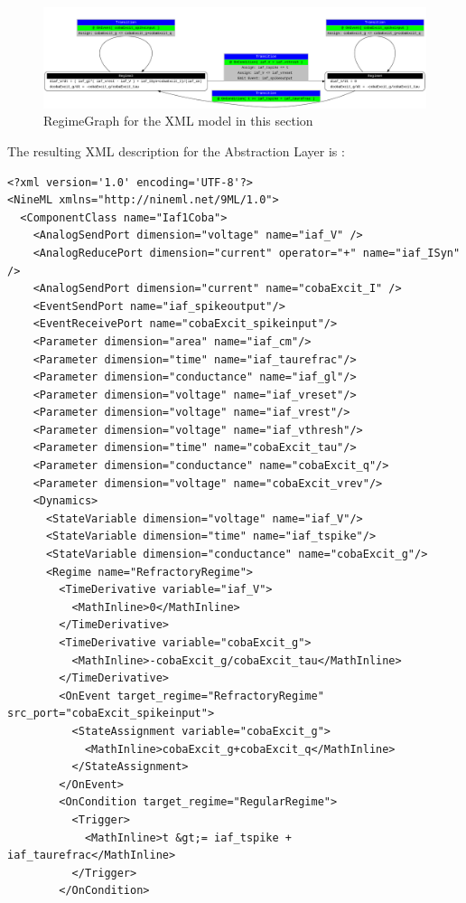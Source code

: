 \documentclass[draftspec]{ninemlspec}
\begin{document}
\begin{figure}[htb!]
\center
\includegraphics[width=14cm]{figures/demo2_Coba1_trnasition.pdf}
\protect\caption{RegimeGraph for the XML model in this section}
\label{fig:EX2_trans}
\end{figure}
\clearpage
The resulting XML description for the Abstraction Layer is :
\begin{lstlisting}[label=code:xmliaf2]
<?xml version='1.0' encoding='UTF-8'?>
<NineML xmlns="http://nineml.net/9ML/1.0">
  <ComponentClass name="Iaf1Coba">
    <AnalogSendPort dimension="voltage" name="iaf_V" />
    <AnalogReducePort dimension="current" operator="+" name="iaf_ISyn" />
    <AnalogSendPort dimension="current" name="cobaExcit_I" />
    <EventSendPort name="iaf_spikeoutput"/>
    <EventReceivePort name="cobaExcit_spikeinput"/>
    <Parameter dimension="area" name="iaf_cm"/>
    <Parameter dimension="time" name="iaf_taurefrac"/>
    <Parameter dimension="conductance" name="iaf_gl"/>
    <Parameter dimension="voltage" name="iaf_vreset"/>
    <Parameter dimension="voltage" name="iaf_vrest"/>
    <Parameter dimension="voltage" name="iaf_vthresh"/>
    <Parameter dimension="time" name="cobaExcit_tau"/>
    <Parameter dimension="conductance" name="cobaExcit_q"/>
    <Parameter dimension="voltage" name="cobaExcit_vrev"/>
    <Dynamics>
      <StateVariable dimension="voltage" name="iaf_V"/>
      <StateVariable dimension="time" name="iaf_tspike"/>
      <StateVariable dimension="conductance" name="cobaExcit_g"/>
      <Regime name="RefractoryRegime">
        <TimeDerivative variable="iaf_V">
          <MathInline>0</MathInline>
        </TimeDerivative>
        <TimeDerivative variable="cobaExcit_g">
          <MathInline>-cobaExcit_g/cobaExcit_tau</MathInline>
        </TimeDerivative>
        <OnEvent target_regime="RefractoryRegime" src_port="cobaExcit_spikeinput">
          <StateAssignment variable="cobaExcit_g">
            <MathInline>cobaExcit_g+cobaExcit_q</MathInline>
          </StateAssignment>
        </OnEvent>
        <OnCondition target_regime="RegularRegime">
          <Trigger>
            <MathInline>t &gt;= iaf_tspike + iaf_taurefrac</MathInline>
          </Trigger>
        </OnCondition>

\end{lstlisting}
\end{document}
